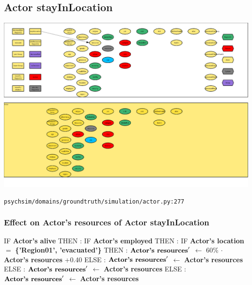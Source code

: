 \documentclass{article}%
\begin{document}
\subsection{Actor stayInLocation}%
\label{subsec:Actor stayInLocation}%
\includegraphics[width=\textwidth]{images/Actor-stayInLocation.png}%
\begin{flushleft}%
\verb|psychsim/domains/groundtruth/simulation/actor.py:277|%
\end{flushleft}%
\subsubsection{Effect on Actor's resources of Actor stayInLocation}%
\label{ssubsec:Effect on Actor's resources of Actor stayInLocation}%
\begin{flushleft}%
IF %
\textbf{Actor's alive}%
\linebreak%
\hspace*{2em}%
THEN %
: %
IF %
\textbf{Actor's employed}%
\linebreak%
\hspace*{4em}%
THEN %
: %
IF %
\textbf{Actor's location}%
$=$%
\textbf{\{'Region01', 'evacuated'\}}%
\linebreak%
\hspace*{6em}%
THEN %
: %
$\mbox{\textbf{Actor's resources}} '$%
$\leftarrow$%
60\%%
$\cdot$%
\textbf{Actor's resources}%
+0.40%
\linebreak%
\hspace*{6em}%
ELSE %
: %
$\mbox{\textbf{Actor's resources}} '$%
$\leftarrow$%
\textbf{Actor's resources}%
\linebreak%
\hspace*{4em}%
ELSE %
: %
$\mbox{\textbf{Actor's resources}} '$%
$\leftarrow$%
\textbf{Actor's resources}%
\linebreak%
\hspace*{2em}%
ELSE %
: %
$\mbox{\textbf{Actor's resources}} '$%
$\leftarrow$%
\textbf{Actor's resources}%
\end{flushleft}
\end{document}
